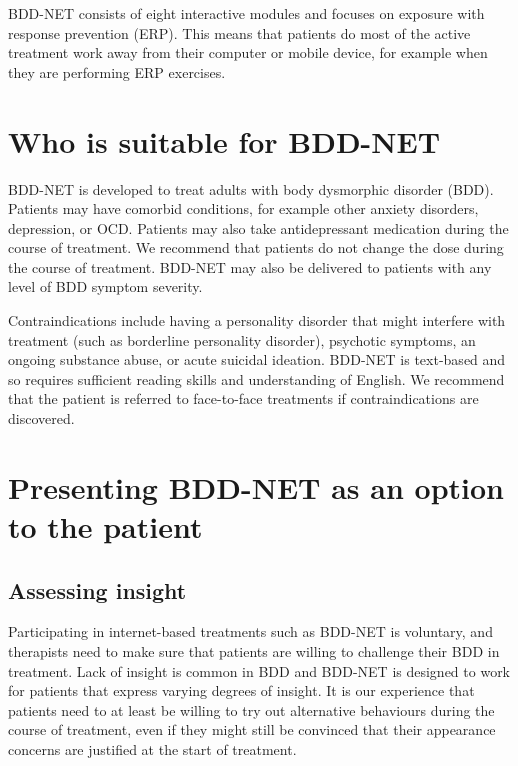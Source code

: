 \documentclass[]{book}
\theoremstyle{definition}
\theoremstyle{definition}
\theoremstyle{definition}
\theoremstyle{remark}
\begin{document}
BDD-NET consists of eight interactive modules and focuses on exposure
with response prevention (ERP). This means that patients do most of the
active treatment work away from their computer or mobile device, for
example when they are performing ERP exercises.

\hypertarget{who-is-suitable-for-bdd-net}{%
\section{Who is suitable for
BDD-NET}\label{who-is-suitable-for-bdd-net}}

BDD-NET is developed to treat adults with body dysmorphic disorder
(BDD). Patients may have comorbid conditions, for example other anxiety
disorders, depression, or OCD. Patients may also take antidepressant
medication during the course of treatment. We recommend that patients do
not change the dose during the course of treatment. BDD-NET may also be
delivered to patients with any level of BDD symptom severity.

Contraindications include having a personality disorder that might
interfere with treatment (such as borderline personality disorder),
psychotic symptoms, an ongoing substance abuse, or acute suicidal
ideation. BDD-NET is text-based and so requires sufficient reading
skills and understanding of English. We recommend that the patient is
referred to face-to-face treatments if contraindications are discovered.

\hypertarget{presenting-bdd-net-as-an-option-to-the-patient}{%
\section{Presenting BDD-NET as an option to the
patient}\label{presenting-bdd-net-as-an-option-to-the-patient}}

\hypertarget{assessing-insight}{%
\subsection{Assessing insight}\label{assessing-insight}}

Participating in internet-based treatments such as BDD-NET is voluntary,
and therapists need to make sure that patients are willing to challenge
their BDD in treatment. Lack of insight is common in BDD and BDD-NET is
designed to work for patients that express varying degrees of insight.
It is our experience that patients need to at least be willing to try
out alternative behaviours during the course of treatment, even if they
might still be convinced that their appearance concerns are justified at
the start of treatment.
\end{document}
